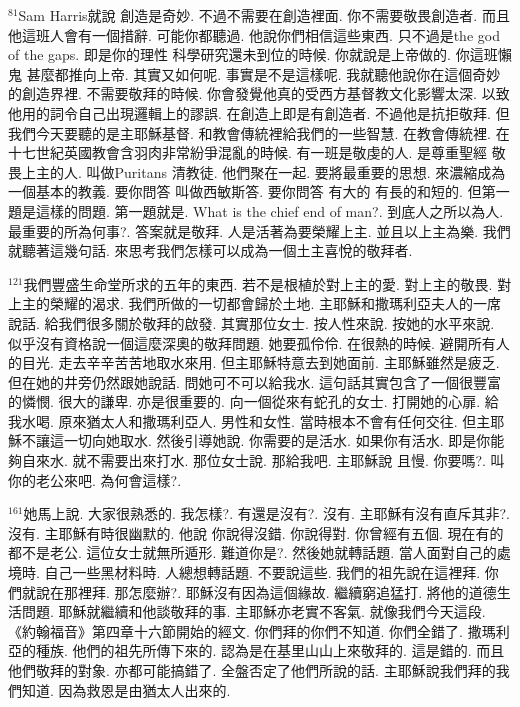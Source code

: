 \documentclass{book}
\begin{document}
$^{81}$Sam Harris就說 創造是奇妙.
不過不需要在創造裡面.
你不需要敬畏創造者.
而且他這班人會有一個措辭.
可能你都聽過.
他說你們相信這些東西.
只不過是the god of the gaps.
即是你的理性 科學研究還未到位的時候.
你就說是上帝做的.
你這班懶鬼 甚麼都推向上帝.
其實又如何呢.
事實是不是這樣呢.
我就聽他說你在這個奇妙的創造界裡.
不需要敬拜的時候.
你會發覺他真的受西方基督教文化影響太深.
以致他用的詞令自己出現邏輯上的謬誤.
在創造上即是有創造者.
不過他是抗拒敬拜.
但我們今天要聽的是主耶穌基督.
和教會傳統裡給我們的一些智慧.
在教會傳統裡.
在十七世紀英國教會含羽肉非常紛爭混亂的時候.
有一班是敬虔的人.
是尊重聖經 敬畏上主的人.
叫做Puritans 清教徒.
他們聚在一起.
要將最重要的思想.
來濃縮成為一個基本的教義.
要你問答 叫做西敏斯答.
要你問答 有大的 有長的和短的.
但第一題是這樣的問題.
第一題就是.
What is the chief end of man?.
到底人之所以為人.
最重要的所為何事?.
答案就是敬拜.
人是活著為要榮耀上主.
並且以上主為樂.
我們就聽著這幾句話.
來思考我們怎樣可以成為一個土主喜悅的敬拜者.

$^{121}$我們豐盛生命堂所求的五年的東西.
若不是根植於對上主的愛.
對上主的敬畏.
對上主的榮耀的渴求.
我們所做的一切都會歸於土地.
主耶穌和撒瑪利亞夫人的一席說話.
給我們很多關於敬拜的啟發.
其實那位女士.
按人性來說.
按她的水平來說.
似乎沒有資格說一個這麼深奧的敬拜問題.
她要孤伶伶.
在很熱的時候.
避開所有人的目光.
走去辛辛苦苦地取水來用.
但主耶穌特意去到她面前.
主耶穌雖然是疲乏.
但在她的井旁仍然跟她說話.
問她可不可以給我水.
這句話其實包含了一個很豐富的憐憫.
很大的謙卑.
亦是很重要的.
向一個從來有蛇孔的女士.
打開她的心扉.
給我水喝.
原來猶太人和撒瑪利亞人.
男性和女性.
當時根本不會有任何交往.
但主耶穌不讓這一切向她取水.
然後引導她說.
你需要的是活水.
如果你有活水.
即是你能夠自來水.
就不需要出來打水.
那位女士說.
那給我吧.
主耶穌說 且慢.
你要嗎?.
叫你的老公來吧.
為何會這樣?.

$^{161}$她馬上說.
大家很熟悉的.
我怎樣?.
有還是沒有?.
沒有.
主耶穌有沒有直斥其非?.
沒有.
主耶穌有時很幽默的.
他說 你說得沒錯.
你說得對.
你曾經有五個.
現在有的都不是老公.
這位女士就無所遁形.
難道你是?.
然後她就轉話題.
當人面對自己的處境時.
自己一些黑材料時.
人總想轉話題.
不要說這些.
我們的祖先說在這裡拜.
你們就說在那裡拜.
那怎麼辦?.
耶穌沒有因為這個緣故.
繼續窮追猛打.
將他的道德生活問題.
耶穌就繼續和他談敬拜的事.
主耶穌亦老實不客氣.
就像我們今天這段.
《約翰福音》第四章十六節開始的經文.
你們拜的你們不知道.
你們全錯了.
撒瑪利亞的種族.
他們的祖先所傳下來的.
認為是在基里山山上來敬拜的.
這是錯的.
而且他們敬拜的對象.
亦都可能搞錯了.
全盤否定了他們所說的話.
主耶穌說我們拜的我們知道.
因為救恩是由猶太人出來的.
\end{document}
